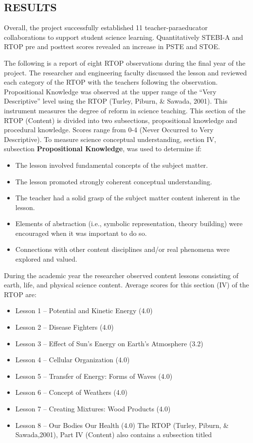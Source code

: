 \documentclass[11.5pt]{sig-alternate} %
\begin{document}
\begin{large}
\section*{RESULTS}

Overall, the project successfully established 11 teacher-paraeducator collaborations to support student science learning. Quantitatively STEBI-A and RTOP pre and posttest scores revealed an increase in PSTE and STOE. 


The following is a report of eight RTOP observations during the final year of the project. The researcher and engineering faculty discussed the lesson and reviewed each category of the RTOP with the teachers following the observation. Propositional Knowledge was observed at the upper range of the “Very Descriptive” level using the RTOP (Turley, Piburn, \& Sawada, 2001). This instrument measures the degree of reform in science teaching. This section of the RTOP (Content) is divided into two subsections, propositional knowledge and procedural knowledge. Scores range from 0-4 (Never Occurred to Very Descriptive). To measure science conceptual understanding, section IV, subsection \textbf{Propositional Knowledge}, was used to determine if:

\begin{itemize}
    \item The lesson involved fundamental concepts of the subject matter.
    \item The lesson promoted strongly coherent conceptual understanding.
    \item The teacher had a solid grasp of the subject matter content inherent in the lesson.
    \item Elements of abstraction (i.e., symbolic representation, theory building) were encouraged when it was important to do so.
    \item Connections with other content disciplines and/or real phenomena were explored and valued.
\end{itemize}

During the academic year the researcher observed content lessons consisting of earth, life, and physical science content. Average scores for this section (IV) of the RTOP are:
 
\begin{itemize}
    \item Lesson 1 – Potential and Kinetic Energy (4.0)
    \item Lesson 2 – Disease Fighters (4.0)
    \item Lesson 3 – Effect of Sun’s Energy on Earth’s Atmosphere (3.2)
    \item Lesson 4 – Cellular Organization (4.0)
    \item Lesson 5 – Transfer of Energy: Forms of Waves (4.0)
    \item Lesson 6 – Concept of Weathers (4.0)
    \item Lesson 7 – Creating Mixtures: Wood Products (4.0)
    \item Lesson 8 – Our Bodies Our Health (4.0) The RTOP (Turley, Piburn, \& Sawada,2001), Part IV (Content) also contains a subsection titled
\end{itemize}


\end{large}
\end{document}
